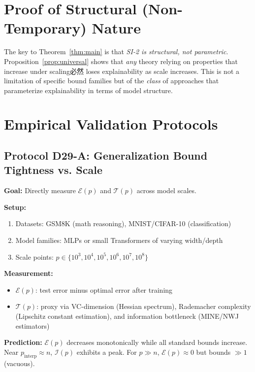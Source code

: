 \documentclass[12pt]{article}
\theoremstyle{definition}
\theoremstyle{remark}
\begin{document}
\section{Proof of Structural (Non-Temporary) Nature}

The key to Theorem~\ref{thm:main} is that \emph{SI-2 is structural, not parametric}. Proposition~\ref{prop:universal} shows that \emph{any} theory relying on properties that increase under scaling必然 loses explainability as scale increases. This is not a limitation of specific bound families but of the \emph{class} of approaches that parameterize explainability in terms of model structure.

\section{Empirical Validation Protocols}

\subsection{Protocol D29-A: Generalization Bound Tightness vs. Scale}

\textbf{Goal:} Directly measure $\mathcal{E}(p)$ and $\mathcal{T}(p)$ across model scales.

\textbf{Setup:}
\begin{enumerate}
  \item Datasets: GSM8K (math reasoning), MNIST/CIFAR-10 (classification)
  \item Model families: MLPs or small Transformers of varying width/depth
  \item Scale points: $p \in \{10^3, 10^4, 10^5, 10^6, 10^7, 10^8\}$
\end{enumerate}

\textbf{Measurement:}
\begin{itemize}
  \item $\mathcal{E}(p)$: test error minus optimal error after training
  \item $\mathcal{T}(p)$: proxy via VC-dimension (Hessian spectrum), Rademacher complexity (Lipschitz constant estimation), and information bottleneck (MINE/NWJ estimators)
\end{itemize}

\textbf{Prediction:} $\mathcal{E}(p)$ decreases monotonically while all standard bounds increase. Near $p_{\text{interp}} \approx n$, $\mathcal{I}(p)$ exhibits a peak. For $p \gg n$, $\mathcal{E}(p) \approx 0$ but bounds $\gg 1$ (vacuous).
\end{document}
